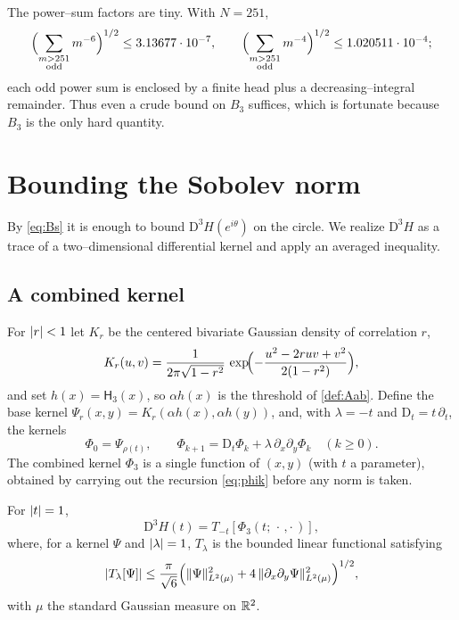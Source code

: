 \documentclass[12pt]{article}
\newcommand{\He}{\mathsf{H}}                 %
\newcommand{\Dop}{\mathrm{D}}              %
\newcommand{\Kr}{K}                          %
\begin{document}
The power--sum factors are tiny.  With $N=251$,
\begin{equation}\label{eq:tailfac}
   \Bigl(\sum_{\substack{m>251\\\mathrm{odd}}}m^{-6}\Bigr)^{1/2}\le3.13677\cdot10^{-7},
   \qquad
   \Bigl(\sum_{\substack{m>251\\\mathrm{odd}}}m^{-4}\Bigr)^{1/2}\le1.020511\cdot10^{-4};
\end{equation}
each odd power sum is enclosed by a finite head plus a decreasing--integral
remainder.  Thus even a crude bound on $B_3$ suffices, which is fortunate
because $B_3$ is the only hard quantity.

\section{Bounding the Sobolev norm}\label{sec:b3}

By \eqref{eq:Bs} it is enough to bound $\Dop^3H(e^{i\theta})$ on the circle.  We
realize $\Dop^3H$ as a trace of a two--dimensional differential kernel and apply
an averaged inequality.

\subsection{A combined kernel}

For $\lvert r\rvert<1$ let $\Kr_r$ be the centered bivariate Gaussian density of
correlation $r$,
\begin{equation}\label{eq:Krkernel}
   \Kr_r(u,v)=\frac{1}{2\pi\sqrt{1-r^2}}\,
   \exp\!\Bigl(-\frac{u^2-2ruv+v^2}{2(1-r^2)}\Bigr),
\end{equation}
and set $h(x)=\He_3(x)$, so $\alpha h(x)$ is the threshold of
\cref{def:Aab}.  Define the base kernel
$\Psi_r(x,y)=\Kr_r(\alpha h(x),\alpha h(y))$, and, with $\lambda=-t$ and
$\Dop_t=t\,\partial_t$, the kernels
\begin{equation}\label{eq:phik}
   \Phi_0=\Psi_{\rho(t)},\qquad
   \Phi_{k+1}=\Dop_t\Phi_k+\lambda\,\partial_x\partial_y\Phi_k\quad(k\ge0).
\end{equation}
The combined kernel $\Phi_3$ is a single function of $(x,y)$ (with $t$ a
parameter), obtained by carrying out the recursion \eqref{eq:phik} before any
norm is taken.

\begin{lemma}\label{lem:trace}
For $\lvert t\rvert=1$,
\[
   \Dop^3H(t)=T_{-t}[\Phi_3(t;\,\cdot\,,\cdot\,)],
\]
where, for a kernel $\Psi$ and $\lvert\lambda\rvert=1$, $T_\lambda$ is the bounded linear
functional satisfying
\begin{equation}\label{eq:traceineq}
   \lvert T_\lambda[\Psi]\rvert\le\frac{\pi}{\sqrt6}
   \Bigl(\lVert\Psi\rVert_{L^2(\mu)}^2
        +4\,\lVert\partial_x\partial_y\Psi\rVert_{L^2(\mu)}^2\Bigr)^{1/2},
\end{equation}
with $\mu$ the standard Gaussian measure on $\mathbb{R}^2$.
\end{lemma}
\end{document}
